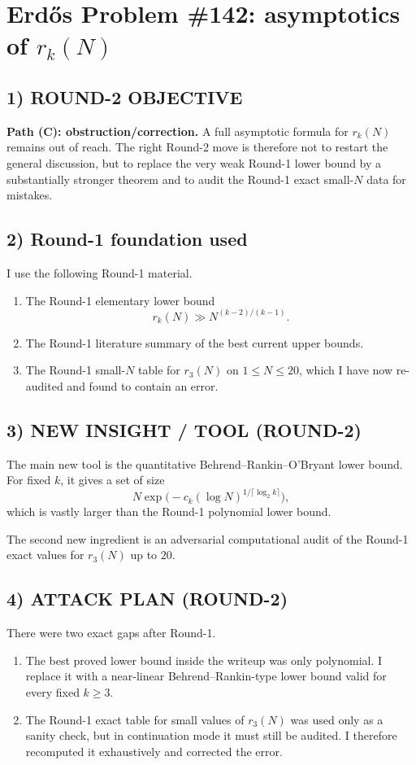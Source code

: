 \section{Erd\H{o}s Problem \#142: asymptotics of $r_k(N)$}

\subsection*{1) ROUND-2 OBJECTIVE}
\textbf{Path (C): obstruction/correction.}  A full asymptotic formula for $r_k(N)$ remains out of reach.  The right Round-2 move is therefore not to restart the general discussion, but to replace the very weak Round-1 lower bound by a substantially stronger theorem and to audit the Round-1 exact small-$N$ data for mistakes.

\subsection*{2) Round-1 foundation used}
I use the following Round-1 material.
\begin{enumerate}
\item The Round-1 elementary lower bound
\[
r_k(N)\gg N^{(k-2)/(k-1)}.
\]
\item The Round-1 literature summary of the best current upper bounds.
\item The Round-1 small-$N$ table for $r_3(N)$ on $1\le N\le 20$, which I have now re-audited and found to contain an error.
\end{enumerate}

\subsection*{3) NEW INSIGHT / TOOL (ROUND-2)}
The main new tool is the quantitative Behrend--Rankin--O'Bryant lower bound.  For fixed $k$, it gives a set of size
\[
N\exp\bigl(-c_k(\log N)^{1/\lceil \log_2 k\rceil}\bigr),
\]
which is vastly larger than the Round-1 polynomial lower bound.

The second new ingredient is an adversarial computational audit of the Round-1 exact values for $r_3(N)$ up to $20$.

\subsection*{4) ATTACK PLAN (ROUND-2)}
There were two exact gaps after Round-1.
\begin{enumerate}
\item The best proved lower bound inside the writeup was only polynomial.  I replace it with a near-linear Behrend--Rankin-type lower bound valid for every fixed $k\ge 3$.
\item The Round-1 exact table for small values of $r_3(N)$ was used only as a sanity check, but in continuation mode it must still be audited.  I therefore recomputed it exhaustively and corrected the error.
\end{enumerate}

